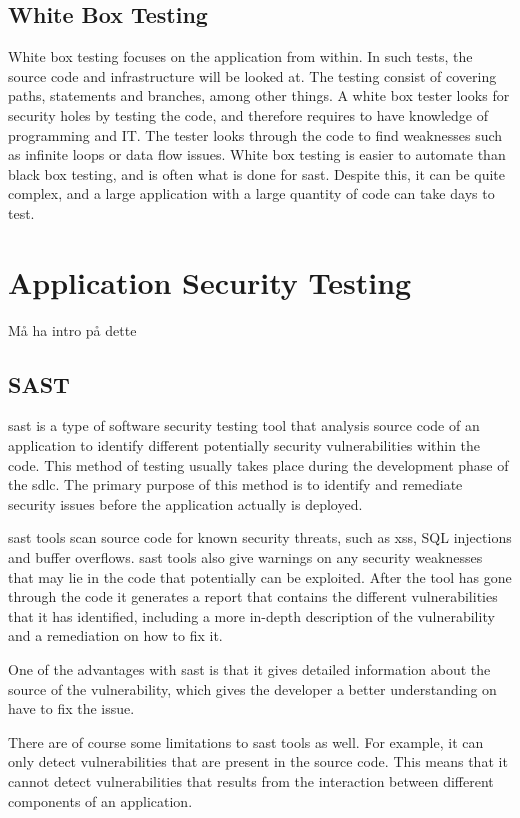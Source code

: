 \subsection{White Box Testing}
White box testing focuses on the application from within. In such tests, the source code and infrastructure will be looked at. The testing consist of covering paths, statements and branches, among other things. A white box tester looks for security holes by testing the code, and therefore requires to have knowledge of programming and IT. The tester looks through the code to find weaknesses such as infinite loops or data flow issues. White box testing is easier to automate than black box testing, and is often what is done for \acrlong{sast}. Despite this, it can be quite complex, and a large application with a large quantity of code can take days to test. \cite{whitebox}

\section{Application Security Testing}
Må ha intro på dette
\subsection{SAST}
\acrlong{sast} is a type of software security testing tool that analysis source code of an application to identify different potentially security vulnerabilities within the code. This method of testing usually takes place during the development phase of the \acrlong{sdlc}. The primary purpose of this method is to identify and remediate security issues before the application actually is deployed. \cite{sast}

\acrshort{sast} tools scan source code for known security threats, such as \acrlong{xss}, SQL injections and buffer overflows. \acrshort{sast} tools also give warnings on any security weaknesses that may lie in the code that potentially can be exploited. After the tool has gone through the code it generates a report that contains the different vulnerabilities that it has identified, including a more in-depth description of the vulnerability and a remediation on how to fix it. 

One of the advantages with \acrshort{sast} is that it gives detailed information about the source of the vulnerability, which gives the developer a better understanding on have to fix the issue. 

There are of course some limitations to \acrshort{sast} tools as well. For example, it can only detect vulnerabilities that are present in the source code. This means that it cannot detect vulnerabilities that results from the interaction between different components of an application.


